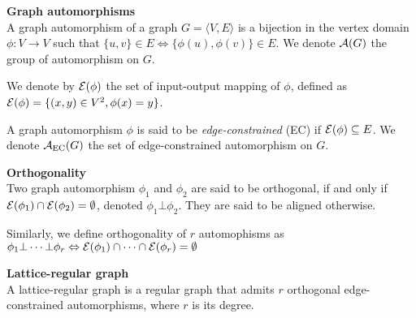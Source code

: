 
\begin{definition}\textbf{Graph automorphisms}\\
A graph automorphism of a graph $G = \langle V,E \rangle$ is a bijection in the vertex domain $\phi: V \rightarrow V$ such that $\{u,v\} \in E \Leftrightarrow \{\phi(u), \phi(v)\} \in E$. We denote $\mathcal{A}(G)$ the group of automorphism on $G$.

We denote by $\mathcal{E}(\phi)$ the set of input-output mapping of $\phi$, defined as $\mathcal{E}(\phi) = \{ (x,y) \in V^2, \phi(x) = y \}$.

A graph automorphism $\phi$ is said to be \emph{edge-constrained} (EC) if $\mathcal{E}(\phi) \subseteq E$. We denote $\mathcal{A}_{\operatorname{EC}}(G)$ the set of edge-constrained automorphism on $G$.
\end{definition}

\begin{definition}\textbf{Orthogonality}\\
Two graph automorphism $\phi_1$ and $\phi_2$ are said to be orthogonal, if and only if $\mathcal{E}(\phi_1) \cap \mathcal{E}(\phi_2) = \emptyset$, denoted $\phi_1 \bot \phi_2$. They are said to be aligned otherwise.

Similarly, we define orthogonality of $r$ automophisms as $\phi_1 \bot \cdots \bot \phi_r \Leftrightarrow \mathcal{E}(\phi_1) \cap \cdots \cap \mathcal{E}(\phi_r) = \emptyset$
\end{definition}

\begin{definition}\textbf{Lattice-regular graph}\\
A lattice-regular graph is a regular graph that admits $r$ orthogonal edge-constrained automorphisms, where $r$ is its degree.
\end{definition}







